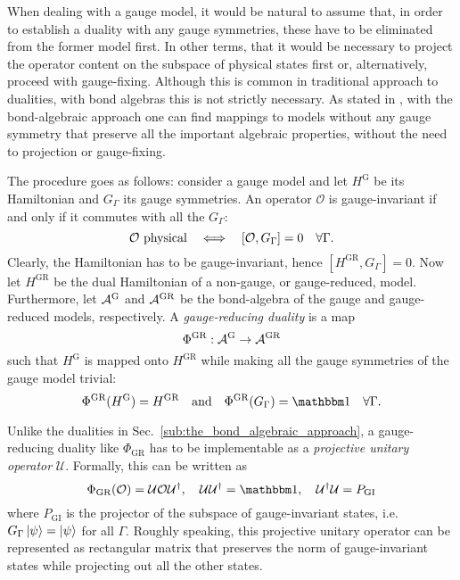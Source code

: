 
When dealing with a gauge model, it would be natural to assume that, in order to establish a duality with any gauge symmetries, these have to be eliminated from the former model first.
In other terms, that it would be necessary to project the operator content on the subspace of physical states first or, alternatively, proceed with gauge-fixing.
Although this is common in traditional approach to dualities, with bond algebras this is not strictly necessary.
As stated in \cite{cobanera2011bond}, with the bond-algebraic approach one can find mappings to models without any gauge symmetry that preserve all the important algebraic properties, without the need to projection or gauge-fixing.

The procedure goes as follows: consider a gauge model and let $H^{\text{G}}$ be its Hamiltonian and $G_{\Gamma}$ its gauge symmetries.
An operator $\mathcal{O}$ is gauge-invariant if and only if it commutes with all the $G_{\Gamma}$:\begin{equation*}
    \mathcal{O} \text{~physical}
    \quad \Longleftrightarrow \quad
    \comm{\mathcal{O}}{G_{\Gamma}} = 0 \quad \forall \Gamma.
\end{equation*}
Clearly, the Hamiltonian has to be gauge-invariant, hence $[H^{\text{GR}}, G_{\Gamma}] = 0$.
Now let $H^{\text{GR}}$ be the dual Hamiltonian of a non-gauge, or gauge-reduced, model.
Furthermore, let $\mathcal{A}^{\text{G}}$ and $\mathcal{A}^{\text{GR}}$ be the bond-algebra of the gauge and gauge-reduced models, respectively.
A \emph{gauge-reducing duality} is a map
\begin{equation*}
    \Phi^{\text{GR}} : \mathcal{A}^{\text{G}} \to \mathcal{A}^{\text{GR}}
\end{equation*}
such that $H^{\text{G}}$ is mapped onto $H^{\text{GR}}$ while making all the gauge symmetries of the gauge model trivial:
\begin{equation}
    \Phi^{\text{GR}}(H^{\text{G}}) = H^{\text{GR}}
    \qand
    \Phi^{\text{GR}}(G_{\Gamma}) = \identity \quad \forall \Gamma.
\end{equation}

Unlike the dualities in Sec.~\ref{sub:the_bond_algebraic_approach}, a gauge-reducing duality like $\Phi_{\text{GR}}$ has to be implementable as a \emph{projective unitary operator} $\mathcal{U}$.
Formally, this can be written as
\begin{equation}
    \Phi_{\text{GR}} ( \mathcal{O} ) = \mathcal{U} \mathcal{O} \mathcal{U}^\dagger, \quad
    \mathcal{U} \mathcal{U}^\dagger = \identity, \quad
    \mathcal{U}^\dagger \mathcal{U} = P_{\text{GI}}
\end{equation}
where $P_{\text{GI}}$ is the projector of the subspace of gauge-invariant states, i.e.~$G_{\Gamma} \ket{\psi} = \ket{\psi}$ for all $\Gamma$.
Roughly speaking, this projective unitary operator can be represented as rectangular matrix that preserves the norm of gauge-invariant states while projecting out all the other states.


